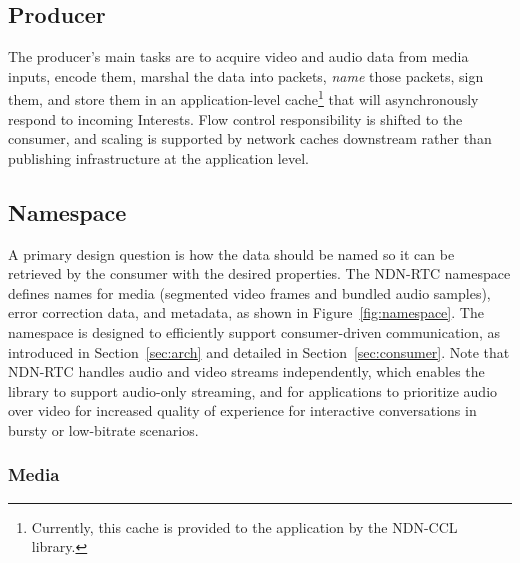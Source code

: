 \documentclass{icn/sig-alternate-2013} %
\newcommand{\ndnrtcName}{NDN-RTC} %
\begin{document}

\subsection{Producer}
The producer's main tasks are to acquire video and audio data from media inputs, encode them, marshal the data into packets, \textit{name} those packets, sign them, and store them in an application-level cache\footnote{Currently, this cache is provided to the application by the NDN-CCL library.} that will asynchronously respond to incoming Interests. Flow control responsibility is shifted to the consumer, and scaling is supported by network caches downstream rather than publishing infrastructure at the application level.  

\subsection{Namespace}

A primary design question is how the data should be named so it can be retrieved by the consumer with the desired properties. The \ndnrtcName{} namespace defines names for media (segmented video frames and bundled audio samples), error correction data, and metadata, as shown in Figure~\ref{fig:namespace}.  The namespace is designed to efficiently support consumer-driven communication, as introduced in Section~\ref{sec:arch} and detailed in Section~\ref{sec:consumer}. Note that \ndnrtcName{} handles audio and video streams independently, which enables the library to support audio-only streaming, and for applications to prioritize audio over video for increased quality of experience for interactive conversations in bursty or low-bitrate scenarios.  

\subsubsection{Media} 
\end{document}
